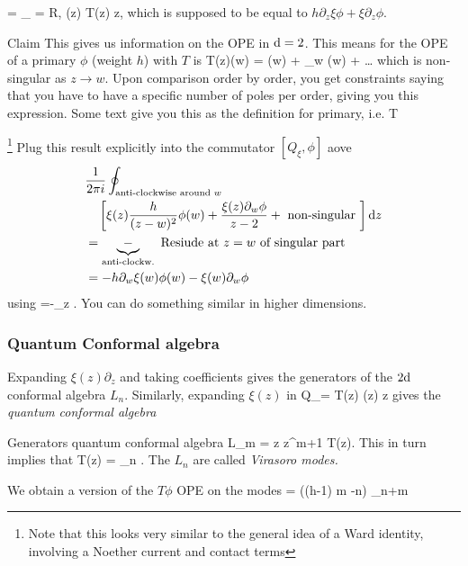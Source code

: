 \be 
[Q_\xi, \phi(w)] =  \oint_{ = R,} \xi(z) T(z) \md z,
\ee 
which is supposed to be equal to $h \partial_z \xi \phi + \xi \partial_z \phi$.
\begin{mybox}{Claim}
	This gives us information on the OPE in $\mathrm{d}=2$. This means for the OPE of a primary $\phi$ (weight $h$) with $T$ is 
	\be 
	\label{eq:cftOPE2d}
	T(z)\phi(w) =  \phi(w) +  \partial_w \phi(w) + \dots 
	\ee 
	which is non-singular as $z\rightarrow w$. Upon comparison order by order, you get constraints saying that you have to have a specific number of poles per order, giving you this expression. Some text give you this as the definition for primary, i.e. 
	\bse 
	 \leftrightarrow {}T
	\ese 
\end{mybox}\footnote{Note that this looks very similar to the general idea of a Ward identity, involving a Noether current and contact terms}
Plug this result explicitly into the commutator $[Q_\xi,\phi]$ aove
\begin{align*}
	&\frac{1}{2 \pi i}  \oint_{\text{anti-clockwise around }w} \\
	& \quad \left[\xi(z) \frac{h}{(z-w)^2} \phi(w) + \frac{\xi(z) \partial_w \phi}{z-2} + \text{ non-singular }\right] \mathrm{d} z \\
	&= \underbrace{-}_{\text{anti-clockw.}} \text{ Resiude at $z=w$ of singular part} \\
	&= - h \partial_w \xi(w) \phi(w) - \xi(w) \partial_w \phi 
\end{align*}
using 
\bse 
{} =-\partial_z .
\ese 
You can do something similar in higher dimensions.
\subsubsection{Quantum Conformal algebra}
\label{subsubsec:virasoro}
Expanding $\xi(z)\partial_z$ and taking coefficients gives the generators of the $2\mathrm{d}$ conformal algebra $L_n$. Similarly, expanding $\xi(z)$ in 
\bse 
Q_\xi = \oint {} T(z) \xi(z) \md z 
\ese 
gives the \emph{quantum conformal algebra}
\begin{mybox}{Generators quantum conformal algebra}
	\be 
	L_m =  \oint \md z z^{m+1} T(z).
	\ee 
	This in turn implies that
	\be 
	T(z) = \sum_n . 
	\ee 
	The $L_n$ are called \emph{Virasoro modes.}
\end{mybox}
We obtain a version of the $T\phi$ OPE on the modes
\be 
[L_m,\phi_n] = \left((h-1) m -n\right) \phi_{n+m}
\ee 



